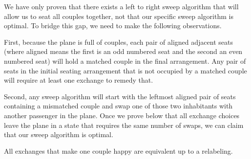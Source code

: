 We have only proven that there exists a left to right sweep algorithm that will allow us to seat all couples together, not that our specific sweep algorithm is optimal.  To bridge this gap, we need to make the following observations.

First, because the plane is full of couples, each pair of aligned adjacent seats (where aligned means the first is an odd numbered seat and the second an even numbered seat) will hold a matched couple in the final arrangement.  Any pair of seats in the initial seating arrangement that is not occupied by a matched couple will require at least one exchange to remedy that.

Second, any sweep algorithm will start with the leftmost aligned pair of seats containing a mismatched couple and swap one of those two inhabitants with another passenger in the plane.  Once we prove below that all exchange choices leave the plane in a state that requires the same number of swaps, we can claim that our sweep algorithm is optimal.

\begin{lem} \label{lem:identicalToRelabel}
All exchanges that make one couple happy are equivalent up to a relabeling.
\end{lem}

